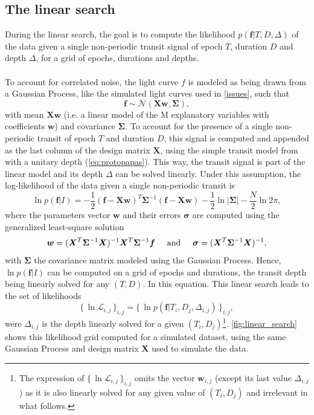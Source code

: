 \documentclass{aastex631}
\newcommand{\set}[1]{\{\,#1\,\}}
\begin{document}
\subsection{The linear search}\label{linear_search}

During the linear search, the goal is to compute the likelihood $p(\bm{f} \vert T , D, \Delta)$ of the data given a single non-periodic transit signal of epoch $T$, duration $D$ and depth $\Delta$, for a grid of epochs, durations and depths.
\\\\
To account for correlated noise, the light curve $f$ is modeled as being drawn from a Gaussian Process, like the simulated light curves used in \autoref{issues}, such that
\begin{equation*}
    \bm{f} \sim \mathcal{N}(\bm{X w}, \bm{\Sigma}),
\end{equation*}
with mean $\bm{Xw}$ (i.e. a linear model of the M explanatory variables with coefficients $\bm{w}$) and covariance $\bm{\Sigma}$. To account for the presence of a single non-periodic transit of epoch $T$ and duration $D$, this signal is computed and appended as the last column of the design matrix $\bm{X}$, using the simple transit model from \cite{protopapas} with a unitary depth (\autoref{eq:protopapas}). This way, the transit signal is part of the linear model and its depth $\Delta$ can be solved linearly. Under this assumption, the log-likelihood of the data given a single non-periodic transit is \citep{Rasmussen2005}
\begin{equation} \label{eq:linear_search_ll}
    \ln p(\bm{f} \vert I) = -\frac{1}{2}(\bm{f}-\bm{Xw})^T\bm{\Sigma}^{-1}(\bm{f}-\bm{Xw}) -  \frac{1}{2}\ln\vert\bm{\Sigma}\vert - \frac{N}{2}\ln 2\pi,
\end{equation}
where the parameters vector $\bm{w}$ and their errors $\bm{\sigma}$ are computed using the generalized least-square solution
\begin{equation}\label{eq:ls}
    \bm{w} = (\bm{X}^T\bm{\Sigma}^{-1}\bm{X})^{-1}\bm{X}^T\bm{\Sigma}^{-1}\bm{f} \hspace{0.5cm} \text{and} \hspace{0.5cm} \bm{\sigma} = (\bm{X}^T\bm{\Sigma}^{-1}\bm{X})^{-1},
\end{equation} 
with $\bm{\Sigma}$ the covariance matrix modeled using the Gaussian Process. Hence, $\ln p(\bm{f} \vert I)$ can be computed on a grid of epochs and durations, the transit depth being linearly solved for any $(T, D)$. In this equation. This linear search leads to the set of likelihoods
\begin{equation*}
    \set{\ln\mathcal{L}_{i,j}}_{i, j} = \set{\ln p(\bm{f} \vert T_i ,D_j, \Delta_{i,j})}_{i, j},
\end{equation*}
were $\Delta_{i,j}$ is the depth linearly solved for a given $(T_i, D_j)$\footnote{The expression of $\set{\ln\mathcal{L}_{i,j}}_{i, j}$ omits the vector $\bm{w}_{i,j}$ (except its last value $\Delta_{i,j}$) as it is also linearly solved for any given value of $(T_i, D_j)$ and irrelevant in what follows.}. \autoref{fig:linear_search} shows this likelihood grid computed for a simulated dataset, using the same Gaussian Process  and design matrix $\bm{X}$ used to simulate the data.
\end{document}
